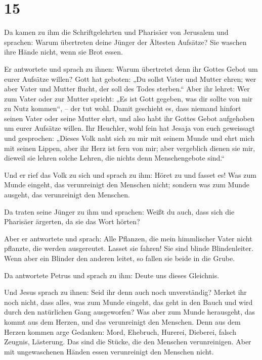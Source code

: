 \hypertarget{section-14}{%
\section{15}\label{section-14}}

 Da kamen zu ihm die Schriftgelehrten und Pharisäer von
Jerusalem und sprachen:  Warum übertreten deine Jünger der
Ältesten Aufsätze? Sie waschen ihre Hände nicht, wenn sie Brot essen.

 Er antwortete und sprach zu ihnen: Warum übertretet denn
ihr Gottes Gebot um eurer Aufsätze willen?  Gott hat
geboten: „Du sollst Vater und Mutter ehren; wer aber Vater und Mutter
flucht, der soll des Todes sterben.``  Aber ihr lehret:
Wer zum Vater oder zur Mutter spricht: „Es ist Gott gegeben, was dir
sollte von mir zu Nutz kommen``, -- der tut wohl.  Damit
geschieht es, dass niemand hinfort seinen Vater oder seine Mutter ehrt,
und also habt ihr Gottes Gebot aufgehoben um eurer Aufsätze willen.
 Ihr Heuchler, wohl fein hat Jesaja von euch geweissagt
und gesprochen:  „Dieses Volk naht sich zu mir mit seinem
Munde und ehrt mich mit seinen Lippen, aber ihr Herz ist fern von mir;
 aber vergeblich dienen sie mir, dieweil sie lehren solche
Lehren, die nichts denn Menschengebote sind.``

 Und er rief das Volk zu sich und sprach zu ihm: Höret zu
und fasset es!  Was zum Munde eingeht, das verunreinigt
den Menschen nicht; sondern was zum Munde ausgeht, das verunreinigt den
Menschen.

 Da traten seine Jünger zu ihm und sprachen: Weißt du
auch, dass sich die Pharisäer ärgerten, da sie das Wort hörten?

 Aber er antwortete und sprach: Alle Pflanzen, die mein
himmlischer Vater nicht pflanzte, die werden ausgereutet.
 Lasset sie fahren! Sie sind blinde Blindenleiter. Wenn
aber ein Blinder den anderen leitet, so fallen sie beide in die Grube.

 Da antwortete Petrus und sprach zu ihm: Deute uns dieses
Gleichnis.

 Und Jesus sprach zu ihnen: Seid ihr denn auch noch
unverständig?  Merket ihr noch nicht, dass alles, was zum
Munde eingeht, das geht in den Bauch und wird durch den natürlichen Gang
ausgeworfen?  Was aber zum Munde herausgeht, das kommt
aus dem Herzen, und das verunreinigt den Menschen.  Denn
aus dem Herzen kommen arge Gedanken: Mord, Ehebruch, Hurerei, Dieberei,
falsch Zeugnis, Lästerung.  Das sind die Stücke, die den
Menschen verunreinigen. Aber mit ungewaschenen Händen essen verunreinigt
den Menschen nicht.

